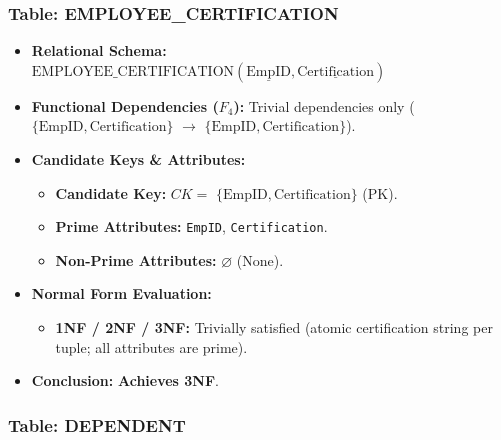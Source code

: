\documentclass[a4paper,12pt]{report}
\providecommand{\tightlist}{%
  \setlength{\itemsep}{0pt}\setlength{\parskip}{0pt}}
\begin{document}
\subsubsection{\texorpdfstring{Table: EMPLOYEE\_\allowbreak{}CERTIFICATION}{Table: EMPLOYEECERTIFICATION}}\label{table-employee_certification}

\begin{itemize}
\item
  \textbf{Relational Schema:} \(\text{EMPLOYEE\_CERTIFICATION}(\underline{\text{EmpID}}, \underline{\text{Certification}})\)
\item
  \textbf{Functional Dependencies (\(F_{4}\)):} Trivial dependencies only (\(\{\text{EmpID}, \text{Certification}\}\) \(\rightarrow\) \(\{\text{EmpID}, \text{Certification}\}\)).
\item
  \textbf{Candidate Keys \& Attributes:}

  \begin{itemize}
  \item
    \textbf{Candidate Key:} \(CK =\) \(\{\text{EmpID}, \text{Certification}\}\) (PK).
  \item
    \textbf{Prime Attributes:} \texttt{EmpID}, \texttt{Certification}.
  \item
    \textbf{Non-Prime Attributes:} \(\varnothing\) (None).
  \end{itemize}
\item
  \textbf{Normal Form Evaluation:}

  \begin{itemize}
  \tightlist
  \item
    \textbf{1NF / 2NF / 3NF:} Trivially satisfied (atomic certification string per tuple; all attributes are prime).
  \end{itemize}
\item
  \textbf{Conclusion:} \textbf{Achieves 3NF}.
\end{itemize}

\subsubsection{Table: DEPENDENT}\label{table-dependent}
\end{document}
